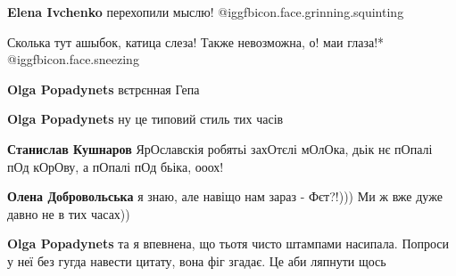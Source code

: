 \begin{itemize}
\begin{itemize}
\textbf{Elena Ivchenko} перехопили мыслю! @igg{fbicon.face.grinning.squinting} 

 
Сколька тут ашыбок, катица слеза!
Также невозможна,
о! маи глаза!* @igg{fbicon.face.sneezing} 

 
\textbf{Olga Popadynets} вєтрєнная Гепа

 
\textbf{Olga Popadynets} ну це типовий стиль тих часів

 
\textbf{Станислав Кушнаров} ЯрОславскія робятьі захОтєлі мОлОка, дьік нє пОпалі пОд кОрОву, а пОпалі пОд бьіка, ооох!

 
\textbf{Олена Добровольська} я знаю, але навіщо нам зараз - Фєт?!))) Ми ж вже дуже давно не в тих часах))

 
\textbf{Olga Popadynets} та я впевнена, що тьотя чисто штампами насипала.
Попроси у неї без гугда навести цитату, вона фіг згадає. Це аби ляпнути щось


\end{itemize}
\end{itemize}
